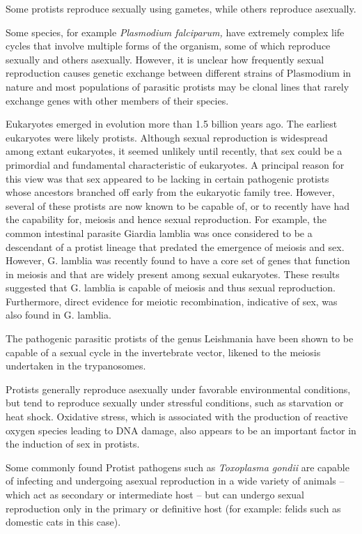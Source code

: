 Some protists reproduce sexually using gametes, while others reproduce asexually.

Some species, for example \emph{Plasmodium falciparum,} have extremely complex life cycles that involve multiple forms of the organism, some of which reproduce sexually and others asexually. However, it is unclear how frequently sexual reproduction causes genetic exchange between different strains of Plasmodium in nature and most populations of parasitic protists may be clonal lines that rarely exchange genes with other members of their species.

Eukaryotes emerged in evolution more than 1.5 billion years ago. The earliest eukaryotes were likely protists. Although sexual reproduction is widespread among extant eukaryotes, it seemed unlikely until recently, that sex could be a primordial and fundamental characteristic of eukaryotes. A principal reason for this view was that sex appeared to be lacking in certain pathogenic protists whose ancestors branched off early from the eukaryotic family tree. However, several of these protists are now known to be capable of, or to recently have had the capability for, meiosis and hence sexual reproduction. For example, the common intestinal parasite Giardia lamblia was once considered to be a descendant of a protist lineage that predated the emergence of meiosis and sex. However, G. lamblia was recently found to have a core set of genes that function in meiosis and that are widely present among sexual eukaryotes. These results suggested that G. lamblia is capable of meiosis and thus sexual reproduction. Furthermore, direct evidence for meiotic recombination, indicative of sex, was also found in G. lamblia.

The pathogenic parasitic protists of the genus Leishmania have been shown to be capable of a sexual cycle in the invertebrate vector, likened to the meiosis undertaken in the trypanosomes.

Protists generally reproduce asexually under favorable environmental conditions, but tend to reproduce sexually under stressful conditions, such as starvation or heat shock. Oxidative stress, which is associated with the production of reactive oxygen species leading to DNA damage, also appears to be an important factor in the induction of sex in protists.

Some commonly found Protist pathogens such as \emph{Toxoplasma gondii} are capable of infecting and undergoing asexual reproduction in a wide variety of animals -- which act as secondary or intermediate host -- but can undergo sexual reproduction only in the primary or definitive host (for example: felids such as domestic cats in this case).

